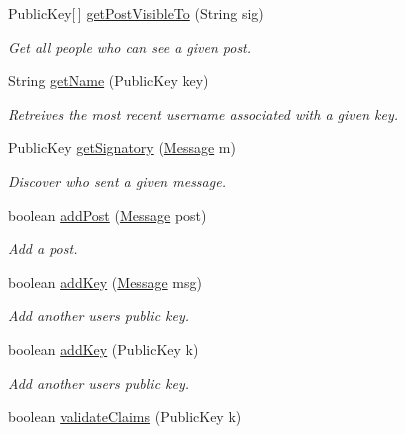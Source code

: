 \begin{DoxyCompactItemize}
Public\-Key\mbox{[}$\,$\mbox{]} \hyperlink{classballmerpeak_1_1turtlenet_1_1server_1_1Database_a0ccbad682720c86cb152de04a7052332}{get\-Post\-Visible\-To} (String sig)
\begin{DoxyCompactList}\small\item\em Get all people who can see a given post. \end{DoxyCompactList}\item 
String \hyperlink{classballmerpeak_1_1turtlenet_1_1server_1_1Database_a102153ec0531bc6be459d0879c78051d}{get\-Name} (Public\-Key key)
\begin{DoxyCompactList}\small\item\em Retreives the most recent username associated with a given key. \end{DoxyCompactList}\item 
Public\-Key \hyperlink{classballmerpeak_1_1turtlenet_1_1server_1_1Database_a890f60c47e11af8823d48689fdeac360}{get\-Signatory} (\hyperlink{classballmerpeak_1_1turtlenet_1_1shared_1_1Message}{Message} m)
\begin{DoxyCompactList}\small\item\em Discover who sent a given message. \end{DoxyCompactList}\item 
boolean \hyperlink{classballmerpeak_1_1turtlenet_1_1server_1_1Database_a8456bb059a9438ecc03a8c65c2cf908a}{add\-Post} (\hyperlink{classballmerpeak_1_1turtlenet_1_1shared_1_1Message}{Message} post)
\begin{DoxyCompactList}\small\item\em Add a post. \end{DoxyCompactList}\item 
boolean \hyperlink{classballmerpeak_1_1turtlenet_1_1server_1_1Database_add2acddf62824bcedfe2724257ab0b04}{add\-Key} (\hyperlink{classballmerpeak_1_1turtlenet_1_1shared_1_1Message}{Message} msg)
\begin{DoxyCompactList}\small\item\em Add another users public key. \end{DoxyCompactList}\item 
boolean \hyperlink{classballmerpeak_1_1turtlenet_1_1server_1_1Database_a4641ac050b40864856bb7ab903fb96c2}{add\-Key} (Public\-Key k)
\begin{DoxyCompactList}\small\item\em Add another users public key. \end{DoxyCompactList}\item 
boolean \hyperlink{classballmerpeak_1_1turtlenet_1_1server_1_1Database_a1d9276229eb90ede286f8ecbee955248}{validate\-Claims} (Public\-Key k)

\end{DoxyCompactItemize}
